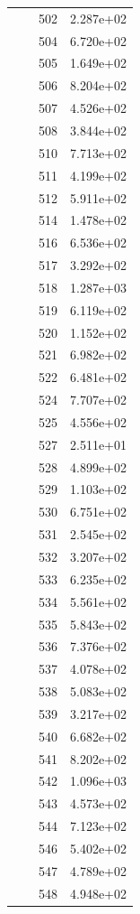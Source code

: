 \documentclass[12pt]{article}
\begin{document}
\begin{longtable}{@{}cccc@{}}
 &  & 502 & 2.287e+02 \\
 &  & 504 & 6.720e+02 \\
 &  & 505 & 1.649e+02 \\
 &  & 506 & 8.204e+02 \\
 &  & 507 & 4.526e+02 \\
 &  & 508 & 3.844e+02 \\
 &  & 510 & 7.713e+02 \\
 &  & 511 & 4.199e+02 \\
 &  & 512 & 5.911e+02 \\
 &  & 514 & 1.478e+02 \\
 &  & 516 & 6.536e+02 \\
 &  & 517 & 3.292e+02 \\
 &  & 518 & 1.287e+03 \\
 &  & 519 & 6.119e+02 \\
 &  & 520 & 1.152e+02 \\
 &  & 521 & 6.982e+02 \\
 &  & 522 & 6.481e+02 \\
 &  & 524 & 7.707e+02 \\
 &  & 525 & 4.556e+02 \\
 &  & 527 & 2.511e+01 \\
 &  & 528 & 4.899e+02 \\
 &  & 529 & 1.103e+02 \\
 &  & 530 & 6.751e+02 \\
 &  & 531 & 2.545e+02 \\
 &  & 532 & 3.207e+02 \\
 &  & 533 & 6.235e+02 \\
 &  & 534 & 5.561e+02 \\
 &  & 535 & 5.843e+02 \\
 &  & 536 & 7.376e+02 \\
 &  & 537 & 4.078e+02 \\
 &  & 538 & 5.083e+02 \\
 &  & 539 & 3.217e+02 \\
 &  & 540 & 6.682e+02 \\
 &  & 541 & 8.202e+02 \\
 &  & 542 & 1.096e+03 \\
 &  & 543 & 4.573e+02 \\
 &  & 544 & 7.123e+02 \\
 &  & 546 & 5.402e+02 \\
 &  & 547 & 4.789e+02 \\
 &  & 548 & 4.948e+02 \\

\end{longtable}
\end{document}

